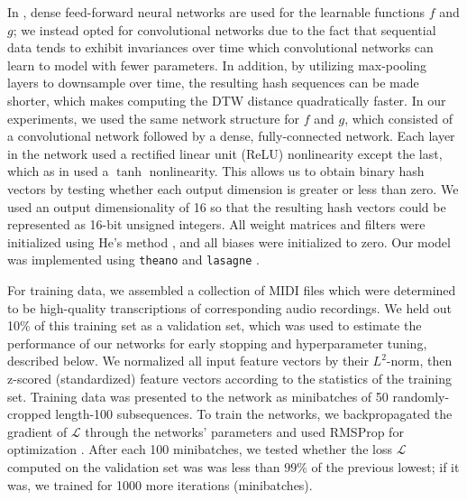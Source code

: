 \documentclass{article} %
\begin{document}
In \cite{masci2014multimodal}, dense feed-forward neural networks are used for the learnable functions $f$ and $g$; we instead opted for convolutional networks due to the fact that sequential data tends to exhibit invariances over time which convolutional networks can learn to model with fewer parameters.
In addition, by utilizing max-pooling layers to downsample over time, the resulting hash sequences can be made shorter, which makes computing the DTW distance quadratically faster.
In our experiments, we used the same network structure for $f$ and $g$, which consisted of a convolutional network followed by a dense, fully-connected network.
Each layer in the network used a rectified linear unit (ReLU) nonlinearity except the last, which as in \cite{masci2014multimodal} used a $\tanh$ nonlinearity.
This allows us to obtain binary hash vectors by testing whether each output dimension is greater or less than zero.
We used an output dimensionality of 16 so that the resulting hash vectors could be represented as 16-bit unsigned integers.
All weight matrices and filters were initialized using He's method \cite{he2015delving}, and all biases were initialized to zero.
Our model was implemented using \texttt{theano} \cite{bastien2012theano,bergstra2010theano} and \texttt{lasagne} \cite{dieleman2015lasagne}.

For training data, we assembled a collection of MIDI files which were determined to be high-quality transcriptions of corresponding audio recordings.
We held out 10\% of this training set as a validation set, which was used to estimate the performance of our networks for early stopping and hyperparameter tuning, described below.
We normalized all input feature vectors by their $L^2$-norm, then z-scored (standardized) feature vectors according to the statistics of the training set.  
Training data was presented to the network as minibatches of 50 randomly-cropped length-100 subsequences.
To train the networks, we backpropagated the gradient of $\mathcal{L}$ through the networks' parameters and used RMSProp for optimization \cite{tieleman2012lecture}.
After each 100 minibatches, we tested whether the loss $\mathcal{L}$ computed on the validation set was was less than $99\%$ of the previous lowest; if it was, we trained for 1000 more iterations (minibatches).
\end{document}
